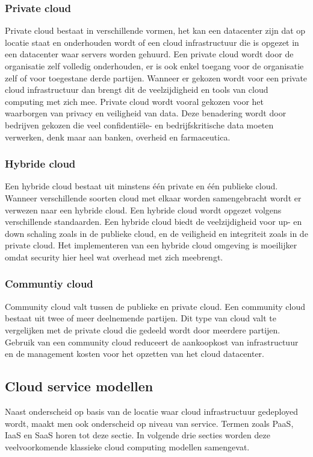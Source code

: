 \subsubsection{Private cloud}
Private cloud bestaat in verschillende vormen, het kan een datacenter zijn dat op locatie staat en onderhouden wordt of een cloud infrastructuur die is opgezet in een datacenter waar servers worden gehuurd. Een private cloud wordt door de organisatie zelf volledig onderhouden, er is ook enkel toegang voor de organisatie zelf of voor toegestane derde partijen. Wanneer er gekozen wordt voor een private cloud infrastructuur dan brengt dit de veelzijdigheid en tools van cloud computing met zich mee. Private cloud wordt vooral gekozen voor het waarborgen van privacy en veiligheid van data. Deze benadering wordt door bedrijven gekozen die veel confidentiële- en bedrijfskritische data moeten verwerken, denk maar aan banken, overheid en farmaceutica. \autocite{Goyal2014}

\subsubsection{Hybride cloud}
Een hybride cloud bestaat uit minstens één private en één publieke cloud. Wanneer verschillende soorten cloud met elkaar worden samengebracht wordt er verwezen naar een hybride cloud. Een hybride cloud wordt opgezet volgens verschillende standaarden. Een hybride cloud biedt de veelzijdigheid voor up- en down schaling zoals in de publieke cloud, en de veiligheid en integriteit zoals in de private cloud. Het implementeren van een hybride cloud omgeving is moeilijker omdat security hier heel wat overhead met zich meebrengt. \autocite{Goyal2014}

\subsubsection{Communtiy cloud}
Community cloud valt tussen de publieke en private cloud. Een community cloud bestaat uit twee of meer deelnemende partijen. Dit type van cloud valt te vergelijken met de private cloud die gedeeld wordt door meerdere partijen. Gebruik van een community cloud reduceert de aankoopkost van infrastructuur en de management kosten voor het opzetten van het cloud datacenter. \autocite{Goyal2014}


\subsection{Cloud service modellen}
\label{cloud-service-level}
Naast onderscheid op basis van de locatie waar cloud infrastructuur gedeployed wordt, maakt men ook onderscheid op niveau van service. Termen zoals PaaS, IaaS en SaaS horen tot deze sectie. In volgende drie secties worden deze veelvoorkomende klassieke cloud computing modellen samengevat.


